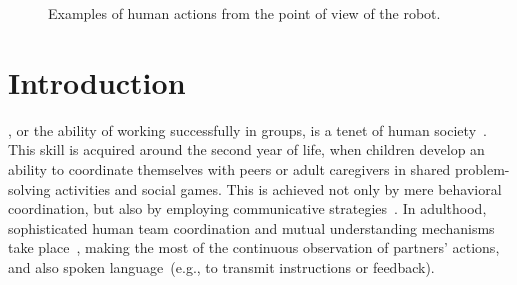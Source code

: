 
\begin{figure*}
  \centering


  \caption{Examples of human actions from the point of view of the robot.}
  \label{fig:action_examples}
\end{figure*}

\section{Introduction}
\label{sec:intro}

, or the ability of working successfully in groups, is a tenet of human society~\cite{turner:1975}.
This skill is acquired around the second year of life, when children develop an ability to coordinate themselves with peers or adult caregivers in shared problem-solving activities and social games.
This is achieved not only by mere behavioral coordination, but also by employing communicative strategies~\cite{melis:2010:rstb}.
In adulthood, sophisticated human team coordination and mutual understanding mechanisms take place~\cite{ramnani:2004:natureneuro}, making the most of the continuous observation of partners' actions, and also spoken language~(e.g., to transmit instructions or feedback).

